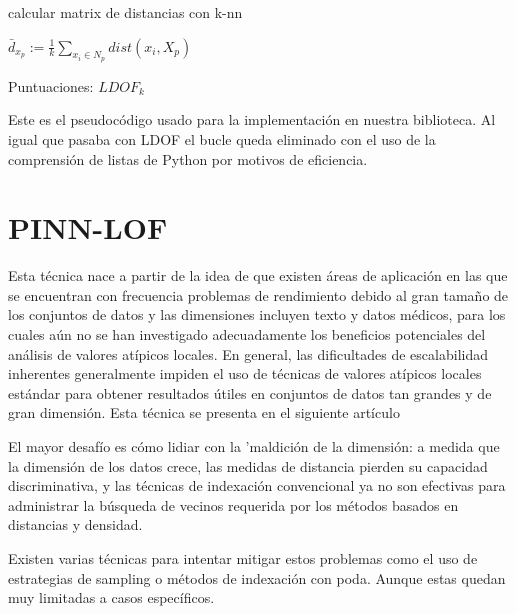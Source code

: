 \begin{codigo}
    \begin{algorithmic}[1]
    \State \parbox[t]{305pt}{calcular matrix de distancias con k-nn}
    \State \parbox[t]{305pt}{ $ \bar{d}_{x_p}  := \frac{1}{k} \sum_{x_i \in N_p} dist(x_i,X_p) $}
    \EndFor
    \State \Return Puntuaciones: $LDOF_k$
    \EndFunction 
    \end{algorithmic}
\end{codigo}

Este es el pseudocódigo usado para la implementación en nuestra biblioteca.
Al igual que pasaba con LDOF el bucle queda eliminado con el uso de la 
comprensión de listas de Python por motivos de eficiencia.


\section{PINN-LOF}
Esta técnica nace a partir de la idea de que existen áreas de 
aplicación en las que se encuentran con frecuencia problemas de 
rendimiento debido al gran tamaño de los conjuntos de datos y las 
dimensiones incluyen texto y datos médicos, para los cuales aún no 
se han investigado adecuadamente los beneficios potenciales del 
análisis de valores atípicos locales. En general, las dificultades 
de escalabilidad inherentes generalmente impiden el uso de técnicas 
de valores atípicos locales estándar para obtener resultados útiles 
en conjuntos de datos tan grandes y de gran dimensión. Esta técnica
se presenta en el siguiente artículo \cite{vriesFindingLocalAnomalies2010}

El mayor desafío es cómo lidiar con la 'maldición de la dimensión:
a medida que la dimensión de los datos crece, las medidas de 
distancia pierden su capacidad discriminativa, y las técnicas de 
indexación convencional ya no son efectivas para administrar la 
búsqueda de vecinos requerida por los métodos basados en distancias y 
densidad.


Existen varias técnicas para intentar mitigar estos problemas como el uso
de estrategias de sampling o métodos de indexación con poda. Aunque estas
quedan muy limitadas a casos específicos.

